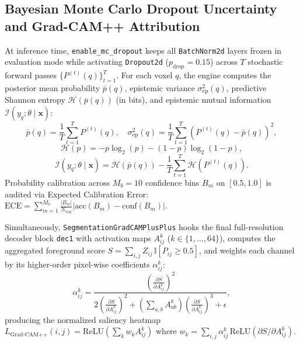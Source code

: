 \documentclass[journal,onecolumn,10pt]{IEEEtran}
\begin{document}
\subsection{Bayesian Monte Carlo Dropout Uncertainty and Grad-CAM++ Attribution}
At inference time, \texttt{enable\_mc\_dropout} keeps all \texttt{BatchNorm2d} layers frozen in evaluation mode while activating \texttt{Dropout2d} ($p_{\text{drop}} = 0.15$) across $T$ stochastic forward passes $\{P^{(t)}(q)\}_{t=1}^T$. For each voxel $q$, the engine computes the posterior mean probability $\bar{p}(q)$, epistemic variance $\sigma_{\text{ep}}^2(q)$, predictive Shannon entropy $\mathcal{H}(\bar{p}(q))$ (in bits), and epistemic mutual information $\mathcal{I}(y_q; \theta \mid \mathbf{x})$:
\begin{equation}
    \bar{p}(q) = \frac{1}{T}\sum_{t=1}^{T} P^{(t)}(q), \quad \sigma_{\text{ep}}^2(q) = \frac{1}{T}\sum_{t=1}^{T}\!\left(P^{(t)}(q) - \bar{p}(q)\right)^2,
    \label{eq:mc_mean_var}
\end{equation}
\begin{equation}
    \mathcal{H}(p) = -p\log_2(p) - (1-p)\log_2(1-p),
    \label{eq:shannon}
\end{equation}
\begin{equation}
    \mathcal{I}(y_q; \theta \mid \mathbf{x}) = \mathcal{H}\!\left(\bar{p}(q)\right) - \frac{1}{T}\sum_{t=1}^{T}\mathcal{H}\!\left(P^{(t)}(q)\right).
    \label{eq:mutual_info}
\end{equation}
Probability calibration across $M_b = 10$ confidence bins $B_m$ on $[0.5, 1.0]$ is audited via Expected Calibration Error: $\text{ECE} = \sum_{m=1}^{M_b} \frac{|B_m|}{N_{\text{vox}}} |\text{acc}(B_m) - \text{conf}(B_m)|$.

Simultaneously, \texttt{SegmentationGradCAMPlusPlus} hooks the final full-resolution decoder block \texttt{dec1} with activation maps $A^k_{ij}$ ($k \in \{1,\dots,64\}$), computes the aggregated foreground score $S = \sum_{i,j} Z_{ij}\,\mathbb{I}[P_{ij} \ge 0.5]$, and weights each channel by its higher-order pixel-wise coefficients $\alpha^{k}_{ij}$:
\begin{equation}
    \alpha^{k}_{ij} = \frac{\left(\frac{\partial S}{\partial A^k_{ij}}\right)^2}{2\left(\frac{\partial S}{\partial A^k_{ij}}\right)^2 + \left(\sum_{a,b} A^k_{ab}\right)\left(\frac{\partial S}{\partial A^k_{ij}}\right)^3 + \epsilon},
    \label{eq:gradcampp}
\end{equation}
producing the normalized saliency heatmap $L_{\text{Grad-CAM++}}(i,j) = \text{ReLU}\!\left(\sum_k w_k A^k_{ij}\right)$ where $w_k = \sum_{i,j} \alpha^k_{ij}\,\text{ReLU}(\partial S / \partial A^k_{ij})$.
\end{document}
